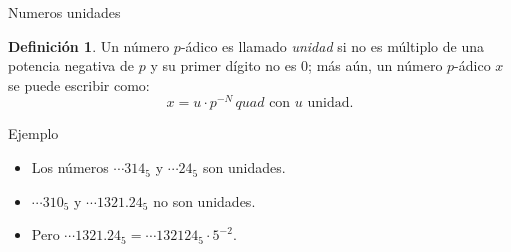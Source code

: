 \documentclass{beamer}
\theoremstyle{definition}
\numberwithin{equation}{section}
\newcommand{\marine}[1]{\textcolor{defColor}{#1}}
\newtheorem{df}{\marine{Definición}}
\begin{document}

\begin{frame}{Numeros unidades}
	\begin{df}
		Un número $p$-ádico es llamado \textit{unidad} si no es múltiplo de una potencia negativa de $p$ y su primer dígito no es $0$; más aún, un número $p$-ádico $x$ se puede escribir como:
		$${x=u\cdot p^{-N}}\,quad \text{ con $u$ unidad}.$$	
	\end{df}
	\begin{exampleblock}{Ejemplo}
		\begin{itemize}[<+- | alert@+>]
			\item Los números $\cdots314_5$ y $\cdots24_5$ son unidades.
			\item  $\cdots310_5$ y $\cdots1321.24_5$ no son unidades.
			\item Pero $\cdots 1321.24_5 = \cdots 132124_5\cdot 5^{-2}.$
		\end{itemize}

	\end{exampleblock}


\end{frame}
\end{document}
